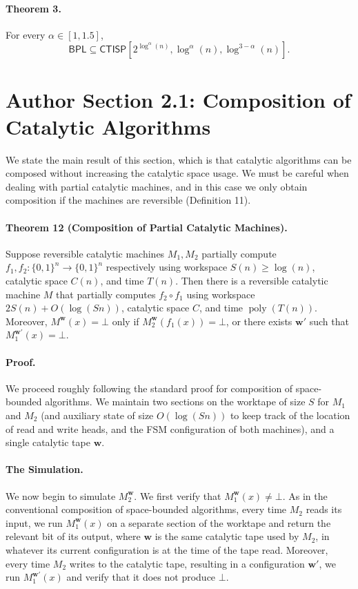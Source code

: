 \documentclass[10pt,a4paper]{article}
\begin{document}

\paragraph{Theorem 3.} For every $\alpha\in[1,1.5]$,
\[\mathsf{BPL}\subseteq\mathsf{CTISP}[2^{\log^\alpha(n)},\log^\alpha(n),\log^{3-\alpha}(n)].\]

\section*{Author Section 2.1: Composition of Catalytic Algorithms}
We state the main result of this section, which is that catalytic algorithms can be composed without increasing the catalytic space usage. We must be careful when dealing with partial catalytic machines, and in this case we only obtain composition if the machines are reversible (Definition 11).
\paragraph{Theorem 12 (Composition of Partial Catalytic Machines).} Suppose reversible catalytic machines $M_1,M_2$ partially compute $f_1,f_2:\{0,1\}^n\to\{0,1\}^n$ respectively using workspace $S(n)\geq\log(n)$, catalytic space $C(n)$, and time $T(n)$. Then there is a reversible catalytic machine $M$ that partially computes $f_2\circ f_1$ using workspace $2S(n)+O(\log(Sn))$, catalytic space $C$, and time $\operatorname{poly}(T(n))$. Moreover, $M^{\mathbf w}(x)=\bot$ only if $M_2^{\mathbf w}(f_1(x))=\bot$, or there exists $\mathbf w'$ such that $M_1^{\mathbf w'}(x)=\bot$.
\paragraph{Proof.} We proceed roughly following the standard proof for composition of space-bounded algorithms. We maintain two sections on the worktape of size $S$ for $M_1$ and $M_2$ (and auxiliary state of size $O(\log(Sn))$ to keep track of the location of read and write heads, and the FSM configuration of both machines), and a single catalytic tape $\mathbf w$.
\paragraph{The Simulation.} We now begin to simulate $M_2^{\mathbf w}$. We first verify that $M_1^{\mathbf w}(x)\neq\bot$. As in the conventional composition of space-bounded algorithms, every time $M_2$ reads its input, we run $M_1^{\mathbf w}(x)$ on a separate section of the worktape and return the relevant bit of its output, where $\mathbf w$ is the same catalytic tape used by $M_2$, in whatever its current configuration is at the time of the tape read. Moreover, every time $M_2$ writes to the catalytic tape, resulting in a configuration $\mathbf w'$, we run $M_1^{\mathbf w'}(x)$ and verify that it does not produce $\bot$.
\end{document}
